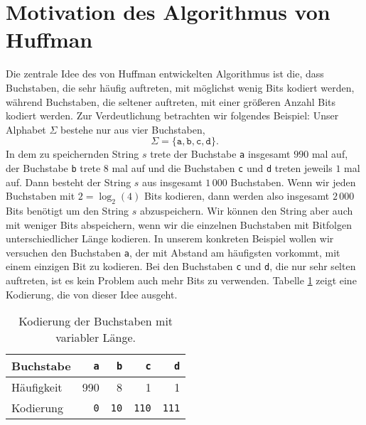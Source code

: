 \section[Motivation]{Motivation des Algorithmus von Huffman}
Die zentrale Idee des von Huffman entwickelten Algorithmus ist die, dass Buchstaben, die sehr
h\"aufig auftreten, mit m\"oglichst wenig Bits kodiert werden, w\"ahrend Buchstaben, die seltener
auftreten, mit einer gr\"o{\ss}eren Anzahl Bits kodiert werden.  Zur Verdeutlichung betrachten
wir folgendes Beispiel:  Unser Alphabet  $\Sigma$ bestehe nur aus vier Buchstaben,
\[ \Sigma = \{ \mathtt{a}, \mathtt{b}, \mathtt{c}, \texttt{d} \}. \]
In dem zu speichernden String $s$ trete der Buchstabe \texttt{a} insgesamt $990$ mal auf, der
Buchstabe \texttt{b} trete $8$ mal auf und die Buchstaben \texttt{c} und \texttt{d} treten
jeweils $1$ mal auf.  Dann besteht der String $s$ aus insgesamt $1\,000$ 
Buchstaben.  Wenn wir jeden Buchstaben mit $2 = \log_2(4)$ Bits kodieren, dann werden also
insgesamt $2\,000$ Bits ben\"otigt um den String $s$ abzuspeichern.  Wir k\"onnen den String
aber auch mit weniger Bits abspeichern, wenn wir die einzelnen Buchstaben mit Bitfolgen
unterschiedlicher L\"ange kodieren.   In unserem konkreten
Beispiel wollen wir versuchen den Buchstaben \texttt{a}, der mit Abstand am h\"aufigsten
vorkommt, mit einem einzigen Bit zu kodieren.  Bei den  Buchstaben
\texttt{c} und \texttt{d}, die nur sehr selten auftreten, ist es kein Problem auch mehr
Bits zu verwenden.  Tabelle \ref{tab:coding} zeigt eine Kodierung, die von dieser Idee
ausgeht. 

\begin{table}[htbp]
  \centering
\begin{tabular}[t]{|l|r|r|r|r|}
\hline
Buchstabe  & \texttt{a} & \texttt{b}  & \texttt{c}   & \texttt{d}   \\
\hline
\hline
H\"aufigkeit &     990    &         8   &           1  &         1    \\
\hline
Kodierung  & \texttt{0} & \texttt{10} & \texttt{110} & \texttt{111} \\
\hline
\end{tabular}
  \caption{Kodierung der Buchstaben mit variabler L\"ange.}
  \label{tab:coding}
\end{table}

